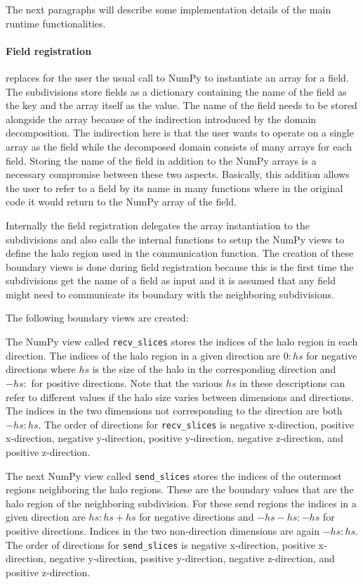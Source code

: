 The next paragraphs will describe some implementation details of the main runtime functionalities.

\paragraph{Field registration } replaces for the user the usual call to NumPy to instantiate an array for a field.
The subdivisions store fields as a dictionary containing the name of the field as the key and the array itself as the value.
The name of the field needs to be stored alongside the array because of the indirection introduced by the domain decomposition.
The indirection here is that the user wants to operate on a single array as the field while the decomposed domain consists of many arrays for each field.
Storing the name of the field in addition to the NumPy arrays is a necessary compromise between these two aspects.
Basically, this addition allows the user to refer to a field by its name in many functions where in the original code it would return to the NumPy array of the field.

Internally the field registration delegates the array instantiation to the subdivisions and also calls the internal functions to setup the NumPy views to define the halo region used in the communication function.
The creation of these boundary views is done during field registration because this is the first time the subdivisions get the name of a field as input and it is assumed that any field might need to communicate its boundary with the neighboring subdivisions.

The following boundary views are created:

The NumPy view called \texttt{recv\_slices} stores the indices of the halo region in each direction.
The indices of the halo region in a given direction are $0:hs$ for negative directions where $hs$ is the size of the halo in the corresponding direction and $-hs:$ for positive directions.
Note that the various $hs$ in these descriptions can refer to different values if the halo size varies between dimensions and directions.
The indices in the two dimensions not corresponding to the direction are both $-hs:hs$.
The order of directions for \texttt{recv\_slices} is negative x-direction, positive x-direction, negative y-direction, positive y-direction, negative z-direction, and positive z-direction.

The next NumPy view called \texttt{send\_slices} stores the indices of the outermost regions neighboring the halo regions.
These are the boundary values that are the halo region of the neighboring subdivision.
For these send regions the indices in a given direction are $hs:hs+hs$ for negative directions and $-hs -hs:-hs$ for positive directions.
Indices in the two non-direction dimensions are again $-hs:hs$.
The order of directions for \texttt{send\_slices} is negative x-direction, positive x-direction, negative y-direction, positive y-direction, negative z-direction, and positive z-direction.

